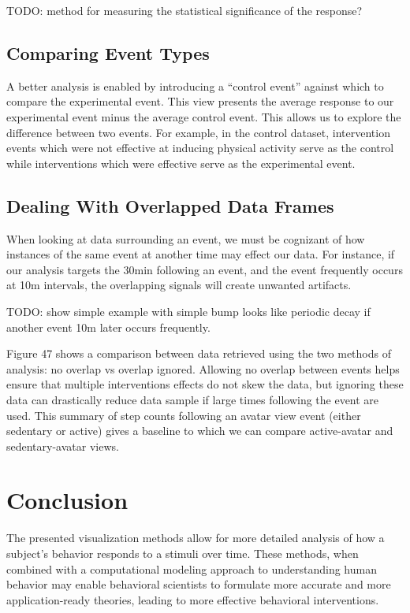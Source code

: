\documentclass[preprint,journal]{vgtc}       %
\begin{document}
TODO: method for measuring the statistical significance of the response?

\subsection{Comparing Event Types}
A better analysis is enabled by introducing a “control event” against which to compare the experimental event. 
This view presents the average response to our experimental event minus the average control event. 
This allows us to explore the difference between two events. 
For example, in the control dataset, intervention events which were not effective at inducing physical activity serve as the control while interventions which were effective serve as the experimental event.

\subsection{Dealing With Overlapped Data Frames}
When looking at data surrounding an event, we must be cognizant of how instances of the same event at another time may effect our data. For instance, if our analysis targets the 30min following an event, and the event frequently occurs at 10m intervals, the overlapping signals will create unwanted artifacts.

TODO: show simple example with simple bump looks like periodic decay if another event 10m later occurs frequently. 

Figure 47 shows a comparison between data retrieved using the two methods of analysis: no overlap vs overlap ignored. 
Allowing no overlap between events helps ensure that multiple interventions effects do not skew the data, but ignoring these data can drastically reduce data sample if large times following the event are used. 
This summary of step counts following an avatar view event (either sedentary or active) gives a baseline to which we can compare active-avatar and sedentary-avatar views.


\section{Conclusion}
The presented visualization methods allow for more detailed analysis of how a subject’s behavior responds to a stimuli over time. 
These methods, when combined with a computational modeling approach to understanding human behavior may enable behavioral scientists to formulate more accurate and more application-ready theories, leading to more effective behavioral interventions. 




\end{document}
